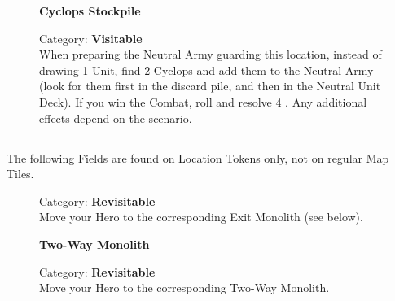 \begin{figure}[H]
  \begin{minipage}[t]{0.47\textwidth}
    \vspace{0pt}
    \centering
    \textbf{Cyclops Stockpile}\par
    \caption{\small Category: \textbf{Visitable}\\
      When preparing the Neutral Army guarding this location, instead of drawing 1  Unit, find 2  Cyclops and add them to the Neutral Army (look for them first in the  discard pile, and then in the  Neutral Unit Deck).
      If you win the Combat, roll and resolve 4 .
      Any additional effects depend on the scenario.
    }
  \end{minipage}\hfill
\end{figure}


\newpage

\subsection*{}

The following Fields are found on Location Tokens only, not on regular Map Tiles.

\begin{figure}[H]
  \begin{minipage}[t]{0.47\textwidth}
    \vspace{0pt}
    \centering
    \phantom{j}\phantom{j}\par
    \caption{\small Category: \textbf{Revisitable}\\
      Move your Hero to the corresponding Exit Monolith (see below).
    }
  \end{minipage}\hfill
  \begin{minipage}[t]{0.47\textwidth}
    \vspace{0pt}
    \centering
    \textbf{Two-Way Monolith}\par
    \caption{\small Category: \textbf{Revisitable}\\
      Move your Hero to the corresponding Two-Way Monolith.
    }
  \end{minipage}
\end{figure}

